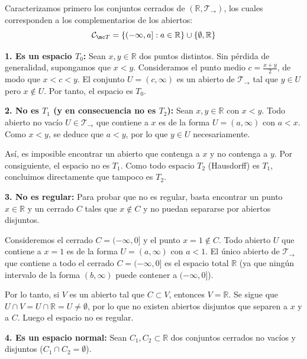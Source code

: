 \begin{sol}
    Caracterizamos primero los conjuntos cerrados de $(\mathbb{R}, \mathcal{T}_{\rightarrow})$, los cuales corresponden a los complementarios de los abiertos:
    \[
        \mathcal{C}_{\mc T} = \{(-\infty, a] : a \in \mathbb{R}\} \cup \{\emptyset, \mathbb{R}\}
    \]

    \noindent \textbf{1. Es un espacio $T_0$:}
    Sean $x, y \in \mathbb{R}$ dos puntos distintos. Sin pérdida de generalidad, supongamos que $x < y$.
    Consideramos el punto medio $c = \frac{x+y}{2}$, de modo que $x < c < y$. El conjunto $U = (c, \infty)$ es un abierto de $\mathcal{T}_{\rightarrow}$ tal que $y \in U$ pero $x \notin U$. Por tanto, el espacio es $T_0$.

    \medskip

    \noindent \textbf{2. No es $T_1$ (y en consecuencia no es $T_2$):}
    Sean $x, y \in \mathbb{R}$ con $x < y$. Todo abierto no vacío $U \in \mathcal{T}_{\rightarrow}$ que contiene a $x$ es de la forma $U = (a, \infty)$ con $a < x$. Como $x < y$, se deduce que $a < y$, por lo que $y \in U$ necesariamente.
    
    Así, es imposible encontrar un abierto que contenga a $x$ y no contenga a $y$. Por consiguiente, el espacio no es $T_1$. Como todo espacio $T_2$ (Hausdorff) es $T_1$, concluimos directamente que tampoco es $T_2$.

    \medskip

    \noindent \textbf{3. No es regular:}
    Para probar que no es regular, basta encontrar un punto $x \in \mathbb{R}$ y un cerrado $C$ tales que $x \notin C$ y no puedan separarse por abiertos disjuntos.
    
    Consideremos el cerrado $C = (-\infty, 0]$ y el punto $x = 1 \notin C$. 
    Todo abierto $U$ que contiene a $x = 1$ es de la forma $U = (a, \infty)$ con $a < 1$.
    El único abierto de $\mathcal{T}_{\rightarrow}$ que contiene a todo el cerrado $C = (-\infty, 0]$ es el espacio total $\mathbb{R}$ (ya que ningún intervalo de la forma $(b, \infty)$ puede contener a $(-\infty, 0]$).
    
    Por lo tanto, si $V$ es un abierto tal que $C \subset V$, entonces $V = \mathbb{R}$. Se sigue que $U \cap V = U \cap \mathbb{R} = U \neq \emptyset$, por lo que no existen abiertos disjuntos que separen a $x$ y a $C$. Luego el espacio no es regular.

    \medskip

    \noindent \textbf{4. Es un espacio normal:}
    Sean $C_1, C_2 \subset \mathbb{R}$ dos conjuntos cerrados no vacíos y disjuntos ($C_1 \cap C_2 = \emptyset$).
    

\end{sol}
